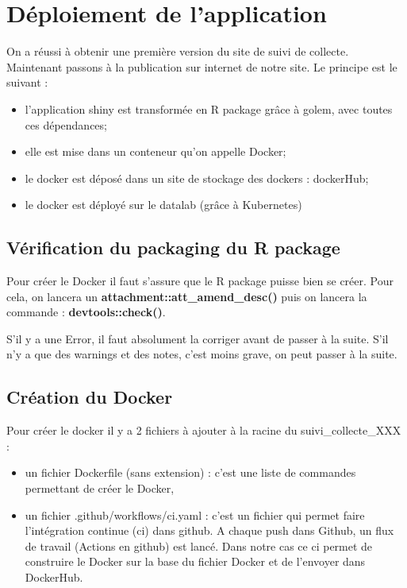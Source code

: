 \documentclass[
  letterpaper,
  DIV=11,
  numbers=noendperiod]{scrreprt}
\providecommand{\tightlist}{%
  \setlength{\itemsep}{0pt}\setlength{\parskip}{0pt}}\usepackage{longtable,booktabs,array}
\begin{document}

\hypertarget{duxe9ploiement-de-lapplication}{%
\chapter{Déploiement de
l'application}\label{duxe9ploiement-de-lapplication}}

On a réussi à obtenir une première version du site de suivi de collecte.
Maintenant passons à la publication sur internet de notre site. Le
principe est le suivant :

\begin{itemize}
\tightlist
\item
  l'application shiny est transformée en R package grâce à golem, avec
  toutes ces dépendances;\\
\item
  elle est mise dans un conteneur qu'on appelle Docker;\\
\item
  le docker est déposé dans un site de stockage des dockers :
  dockerHub;\\
\item
  le docker est déployé sur le datalab (grâce à Kubernetes)
\end{itemize}

\hypertarget{vuxe9rification-du-packaging-du-r-package}{%
\section{Vérification du packaging du R
package}\label{vuxe9rification-du-packaging-du-r-package}}

Pour créer le Docker il faut s'assure que le R package puisse bien se
créer. Pour cela, on lancera un \textbf{attachment::att\_amend\_desc()}
puis on lancera la commande : \textbf{devtools::check()}.

S'il y a une Error, il faut absolument la corriger avant de passer à la
suite. S'il n'y a que des warnings et des notes, c'est moins grave, on
peut passer à la suite.

\hypertarget{cruxe9ation-du-docker}{%
\section{Création du Docker}\label{cruxe9ation-du-docker}}

Pour créer le docker il y a 2 fichiers à ajouter à la racine du
suivi\_collecte\_XXX :

\begin{itemize}
\tightlist
\item
  un fichier Dockerfile (sans extension) : c'est une liste de commandes
  permettant de créer le Docker,\\
\item
  un fichier .github/workflows/ci.yaml : c'est un fichier qui permet
  faire l'intégration continue (ci) dans github. A chaque push dans
  Github, un flux de travail (Actions en github) est lancé. Dans notre
  cas ce ci permet de construire le Docker sur la base du fichier Docker
  et de l'envoyer dans DockerHub.
\end{itemize}
\end{document}
